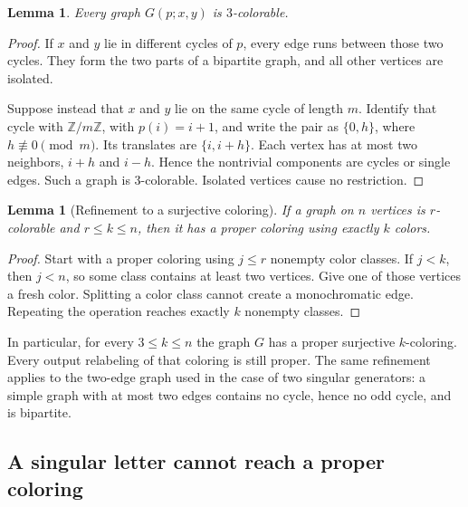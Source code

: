 \documentclass[11pt,a4paper]{article}
\numberwithin{equation}{section}
\newtheorem{lemma}[theorem]{Lemma}
\theoremstyle{definition}
\theoremstyle{remark}
\newcommand{\Z}{\mathbb Z}
\begin{document}
\begin{lemma}\label{lem:threecolor}
Every graph $G(p;x,y)$ is $3$-colorable.
\end{lemma}
\begin{proof}
If $x$ and $y$ lie in different cycles of $p$, every edge runs between those
two cycles. They form the two parts of a bipartite graph, and all other
vertices are isolated.

Suppose instead that $x$ and $y$ lie on the same cycle of length $m$.
Identify that cycle with $\Z/m\Z$, with $p(i)=i+1$, and write the pair as
$\{0,h\}$, where $h\not\equiv0\pmod m$. Its translates are
$\{i,i+h\}$. Each vertex has at most two neighbors, $i+h$ and $i-h$.
Hence the nontrivial components are cycles or single edges. Such a graph is
$3$-colorable. Isolated vertices cause no restriction.
\end{proof}

\begin{lemma}[Refinement to a surjective coloring]\label{lem:refine}
If a graph on $n$ vertices is $r$-colorable and $r\le k\le n$, then it has a
proper coloring using exactly $k$ colors.
\end{lemma}
\begin{proof}
Start with a proper coloring using $j\le r$ nonempty color classes. If
$j<k$, then $j<n$, so some class contains at least two vertices. Give one of
those vertices a fresh color. Splitting a color class cannot create a
monochromatic edge. Repeating the operation reaches exactly $k$ nonempty
classes.
\end{proof}

In particular, for every $3\le k\le n$ the graph $G$ has a proper surjective
$k$-coloring. Every output relabeling of that coloring is still proper.
The same refinement applies to the two-edge graph used in the case of two
singular generators: a simple graph with at most two edges contains no cycle,
hence no odd cycle, and is bipartite.

\subsection{A singular letter cannot reach a proper coloring}
\end{document}
